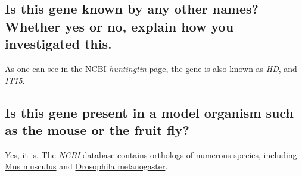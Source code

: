 \subsection{Is this gene known by any other names? Whether yes or no, explain how you investigated this.}

As one can see in the \href{https://www.ncbi.nlm.nih.gov/gene/3064}{NCBI \textit{huntingtin} page}, the gene is also known as \textit{HD}, and \textit{IT15}.


\subsection{Is this gene present in a model organism such as the mouse or the fruit fly?}

Yes, it is. The \textit{NCBI} database contains \href{https://www.ncbi.nlm.nih.gov/gene/?Term=ortholog_gene_3064[group]}{orthologs of numerous species}, including \href{https://www.ncbi.nlm.nih.gov/gene/15194}{Mus musculus} and \href{https://www.ncbi.nlm.nih.gov/gene/43392}{Drosophila melanogaster}.

\newpage
